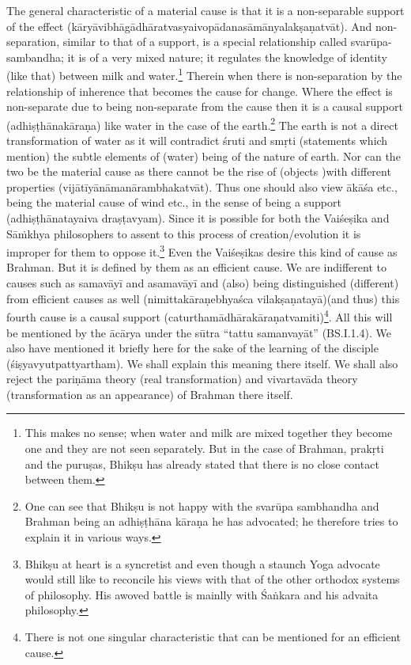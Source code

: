 The general characteristic of a material cause is that it is a non-sepa\-rable support of the effect (kāryāvibhāgādhāratvasyaivopādanasāmān\-yalakṣaṇatvāt). And non-separation, similar to that of a support, is a special relationship called svarūpa-sambandha; it is of a very mixed nature; it regulates the knowledge of identity (like that) between milk and water.\footnote{This makes no sense; when water and milk are mixed together they become one and they are not seen separately. But in the case of Brahman, prakṛti and the puruṣas, Bhikṣu has already stated that there is no close contact between them.} Therein when there is non-separation by the relationship of inherence that becomes the cause for change. Where the effect is non-separate due to being non-separate from the cause then it is a causal support (adhiṣṭhānakāraṇa) like water in the case of the earth.\footnote{One can see that Bhikṣu is not happy with the svarūpa sambhandha and Brahman being an adhiṣṭhāna kāraṇa he has advocated; he therefore tries to explain it in various ways.} The earth is not a direct transformation of water as it will contradict śruti and smṛti (statements which mention) the subtle elements of (water) being of the nature of earth. Nor can the two be the material cause as there cannot be the rise of (objects )with different properties (vijātīyānāmanārambhakatvāt). Thus one should also view ākāśa etc., being the material cause of wind etc., in the sense of being a support (adhiṣṭhānatayaiva draṣṭavyam). Since it is possible for both the Vaiśeṣika and Sāṁkhya philosophers to assent to this process of creation/evolution it is improper for them to oppose it.\footnote{Bhikṣu at heart is a syncretist and even though a staunch Yoga advocate would still like to reconcile his views with that of the other orthodox systems of philosophy. His awoved battle is mainlly with Śaṅkara and his advaita philosophy.} Even the Vaiśeṣikas desire this kind of cause as Brahman. But it is defined by them as an efficient cause. We are indifferent to causes such as samavāyī and asamavāyī and (also) being distinguished (different) from efficient causes as well (nimittakāraṇebhyaśca vilakṣaṇatayā)\break (and thus) this fourth cause is a causal support (caturthamādhārakāra\-ṇatvamiti)\footnote{There is not one singular characteristic that can be mentioned for an efficient cause.}. All this will be mentioned by the ācārya under the sūtra “tattu samanvayāt” (BS.I.1.4). We also have mentioned it briefly here for the sake of the learning of the disciple (śiṣyavyutpattyartham). We shall explain this meaning there itself. We shall also reject the pariṇāma theory (real transformation) and vivartavāda theory (transformation as an appearance) of Brahman there itself. 

